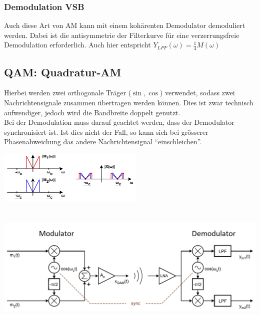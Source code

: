 \subsubsection{Demodulation VSB}
	Auch diese Art von AM kann mit einem kohärenten Demodulator demoduliert werden. Dabei ist die antisymmetrie der Filterkurve für eine verzerrungsfreie Demodulation erforderlich.
	Auch hier entspricht $Y_{LPF}(\omega) = \frac{1}{4}M(\omega)$


\subsection{QAM: Quadratur-AM}
	\begin{minipage}{12cm}
		Hierbei werden zwei orthogonale Träger ($\sin, \cos$) verwendet, sodass zwei Nachrichtensignale zusammen übertragen werden können. Dies ist zwar technisch aufwendiger, jedoch wird die Bandbreite doppelt genutzt. \\
		Bei der Demodulation muss darauf geachtet werden, dass der Demodulator synchronisiert ist. Ist dies nicht der Fall, so kann sich bei grösserer Phasenabweichung das andere Nachrichtensignal ``einschleichen''.
	\end{minipage}
	\begin{minipage}{7cm}
		\includegraphics[width=7cm]{bilder/am_qam_spektrum.png}
	\end{minipage}
	\begin{center}
    	\includegraphics[height=6cm]{bilder/QAM_ModulatorDemodulator.png}
	\end{center}
